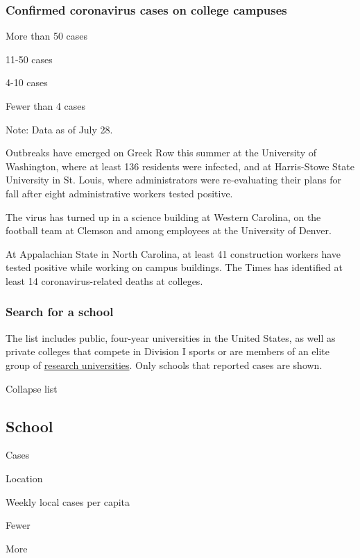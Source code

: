 \hypertarget{confirmed-coronavirus-cases-on-college-campuses}{%
\subsubsection{Confirmed coronavirus cases on college
campuses}\label{confirmed-coronavirus-cases-on-college-campuses}}

More than 50 cases

11-50 cases

4-10 cases

Fewer than 4 cases

Note: Data as of July 28.

Outbreaks have emerged on Greek Row this summer at the University of
Washington, where at least 136 residents were infected, and at
Harris-Stowe State University in St. Louis, where administrators were
re-evaluating their plans for fall after eight administrative workers
tested positive.

The virus has turned up in a science building at Western Carolina, on
the football team at Clemson and among employees at the University of
Denver.

At Appalachian State in North Carolina, at least 41 construction workers
have tested positive while working on campus buildings. The Times has
identified at least 14 coronavirus-related deaths at colleges.

\hypertarget{search-for-a-school}{%
\subsubsection{Search for a school}\label{search-for-a-school}}

The list includes public, four-year universities in the United States,
as well as private colleges that compete in Division I sports or are
members of an elite group of \href{https://www.aau.edu/}{research
universities}. Only schools that reported cases are shown.

Collapse list

\hypertarget{school}{%
\subsection{School}\label{school}}

Cases

Location

Weekly local cases per capita

Fewer

More

